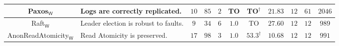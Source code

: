 \begin{table}[t!]
\begin{tabular}{c|P{4.0cm}||ccc||cc||c|ccc}
\midrule
{\scriptsize\textsf{Paxos}$_{\mathsf{W}}$}\cite{ModP} & {\scriptsize Logs are correctly replicated.} & $10$ & $85$ & $2$ & {\tiny TO} & {\tiny TO}$^{\dagger}$ & $21.83$ & $12$ & $61$ & $2046$\\
\midrule
{\scriptsize\textsf{Raft}$_{\mathsf{W}}$} & {\scriptsize Leader election is robust to faults.} & $9$ & $34$ & $6$ & $1.0$ & {\tiny TO} & $27.60$ & $12$ & $12$ & $989$\\
\midrule
\textsf{AnonReadAtomicity}$_{\mathsf{W}}$ & {\scriptsize Read Atomicity is preserved.} & $17$ & $98$ & $3$ & $1.0$ & $53.3^{\dagger}$ & $10.68$ & $12$ & $12$ & $991$\\
\bottomrule
\end{tabular}
\label{tab:evaluation-rich-2}
\vspace*{-.15in}
\end{table}

